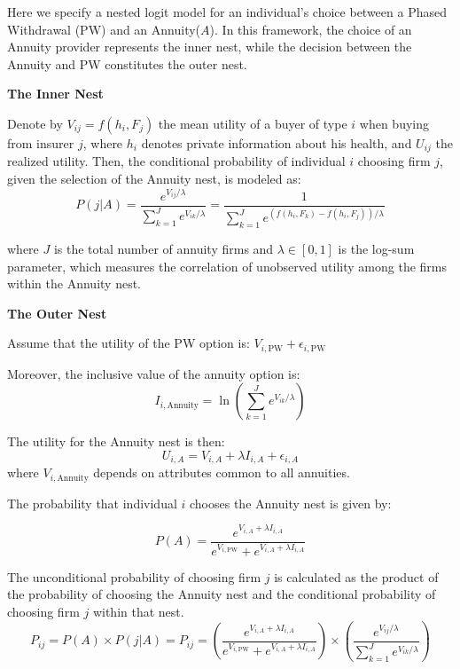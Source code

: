 \documentclass[12pt]{article}
\theoremstyle{plain}
\theoremstyle{plain}
\begin{document}
Here we specify a nested logit model for an individual's choice between a Phased Withdrawal (PW) and an Annuity($A$). In this framework, the choice of an Annuity provider represents the inner nest, while the  decision between the Annuity and PW constitutes the outer nest.

\textbf{The Inner Nest}

Denote by $V_{ij} = f(h_i, F_j)$ the mean utility of a buyer of type $i$ when buying from insurer $j$, where $h_i$ denotes private information about his health, and $U_{ij}$ the realized utility. Then, the conditional probability of individual $i$ choosing firm $j$, given the selection of the Annuity nest, is modeled as:
\begin{equation}\label{eq:inner_prob}
    P(j|A) = \frac{e^{V_{ij} / \lambda}}{\sum_{k=1}^{J} e^{V_{ik} / \lambda}} = \frac{1}{\sum_{k=1}^{J} e^{(f(h_i, F_k)-f(h_i, F_j)) / \lambda}}
\end{equation}

where $J$ is the total number of annuity firms and $\lambda\in[0,1]$ is the log-sum parameter, which measures the correlation of unobserved utility among the firms within the Annuity nest. 


\textbf{The Outer Nest}

Assume that the utility of the PW option is: $V_{i, \text{PW}} + \epsilon_{i, \text{PW}}$

Moreover, the inclusive value of the annuity option is: 
\begin{equation}
    I_{i, \text{Annuity}} = \ln\left(\sum_{k=1}^{J} e^{V_{ik} / \lambda}\right)
\end{equation}

The utility for the Annuity nest is then:
\begin{equation}
    U_{i, A} = V_{i, A} + \lambda I_{i, A} + \epsilon_{i, A}
\end{equation}
where $V_{i, \text{Annuity}}$ depends on attributes common to all annuities.


The probability that individual $i$ chooses the Annuity nest is given by:

\begin{equation}
    P(A) = \frac{e^{V_{i,A} + \lambda I_{i, A}}}{e^{V_{i, \text{PW}}} + e^{V_{i, A} + \lambda I_{i, A}}}
\end{equation}


The unconditional probability of choosing firm $j$ is calculated as the product of the probability of choosing the Annuity nest and the conditional probability of choosing firm $j$ within that nest.
\begin{equation}
    P_{ij} = P(A) \times P(j|A) =
    P_{ij} = \left( \frac{e^{V_{i, A} + \lambda I_{i, A}}}{e^{V_{i, \text{PW}}} + e^{V_{i, A} + \lambda I_{i, A}}} \right) \times \left( \frac{e^{V_{ij} / \lambda}}{\sum_{k=1}^{J} e^{V_{ik} / \lambda}} \right)
\end{equation}
\end{document}
